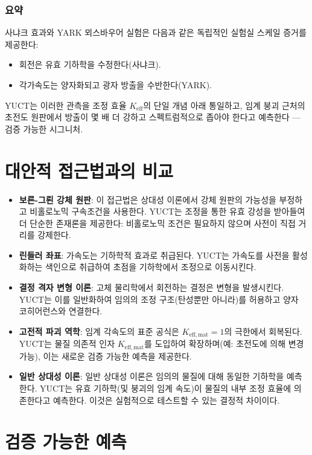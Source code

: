 \documentclass[12pt,a4paper]{article}
\begin{document}
	\subsubsection{요약}
	
	사냐크 효과와 YARK 뫼스바우어 실험은 다음과 같은 독립적인 실험실 스케일 증거를 제공한다:
	\begin{itemize}
		\item 회전은 유효 기하학을 수정한다(사냐크).
		\item 각가속도는 양자화되고 광자 방출을 수반한다(YARK).
	\end{itemize}
	YUCT는 이러한 관측을 조정 효율 \(K_{\mathrm{eff}}\)의 단일 개념 아래 통일하고, 임계 붕괴 근처의 초전도 원판에서 방출이 몇 배 더 강하고 스펙트럼적으로 좁아야 한다고 예측한다 — 검증 가능한 시그니처.
	
	\section{대안적 접근법과의 비교}
	\label{sec:comparison}
	
	\begin{itemize}
		\item \textbf{보른-그뢴 강체 원판}: 이 접근법은 상대성 이론에서 강체 원판의 가능성을 부정하고 비홀로노믹 구속조건을 사용한다. YUCT는 조정을 통한 유효 강성을 받아들여 더 단순한 존재론을 제공한다: 비홀로노믹 조건은 필요하지 않으며 사전이 직접 거리를 강제한다.
		\item \textbf{린들러 좌표}: 가속도는 기하학적 효과로 취급된다. YUCT는 가속도를 사전을 활성화하는 색인으로 취급하여 초점을 기하학에서 조정으로 이동시킨다.
		\item \textbf{결정 격자 변형 이론}: 고체 물리학에서 회전하는 결정은 변형을 발생시킨다. YUCT는 이를 일반화하여 임의의 조정 구조(탄성뿐만 아니라)를 허용하고 양자 코히어런스와 연결한다.
		\item \textbf{고전적 파괴 역학}: 임계 각속도의 표준 공식은 \(K_{\mathrm{eff,mat}} = 1\)의 극한에서 회복된다. YUCT는 물질 의존적 인자 \(K_{\mathrm{eff,mat}}\)를 도입하여 확장하며(예: 초전도에 의해 변경 가능), 이는 새로운 검증 가능한 예측을 제공한다.
		\item \textbf{일반 상대성 이론}: 일반 상대성 이론은 임의의 물질에 대해 동일한 기하학을 예측한다. YUCT는 유효 기하학(및 붕괴의 임계 속도)이 물질의 내부 조정 효율에 의존한다고 예측한다. 이것은 실험적으로 테스트할 수 있는 결정적 차이이다.
	\end{itemize}
	
	\section{검증 가능한 예측}
	\label{sec:predict}
	
\end{document}
